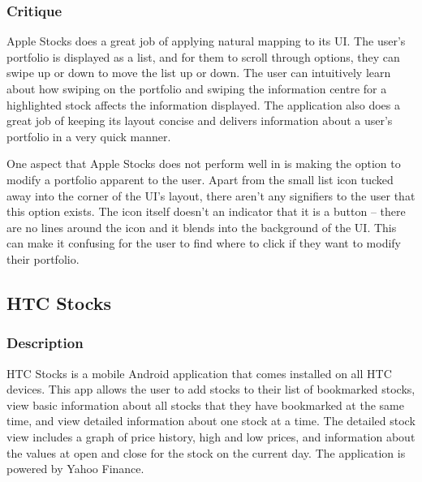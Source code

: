 \documentclass{sigchi}
\begin{document}
\subsubsection{Critique}
Apple Stocks does a great job of applying natural mapping to its UI. The user's portfolio is displayed as a list, and for them to scroll through options, they can swipe up or down to move the list up or down. The user can intuitively learn about how swiping on the portfolio and swiping the information centre for a highlighted stock affects the information displayed. The application also does a great job of keeping its layout concise and delivers information about a user's portfolio in a very quick manner. \par
One aspect that Apple Stocks does not perform well in is making the option to modify a portfolio apparent to the user. Apart from the small list icon tucked away into the corner of the UI's layout, there aren't any signifiers to the user that this option exists. The icon itself doesn't an indicator that it is a button – there are no lines around the icon and it blends into the background of the UI. This can make it confusing for the user to find where to click if they want to modify their portfolio.



\subsection{HTC Stocks}
\subsubsection{Description}
HTC Stocks is a mobile Android application that comes installed on all HTC devices.  This app allows the user to add stocks to their list of bookmarked stocks, view basic information about all stocks that they have bookmarked at the same time, and view detailed information about one stock at a time.  The detailed stock view includes a graph of price history, high and low prices, and information about the values at open and close for the stock on the current day.  The application is powered by Yahoo Finance.

\end{document}
